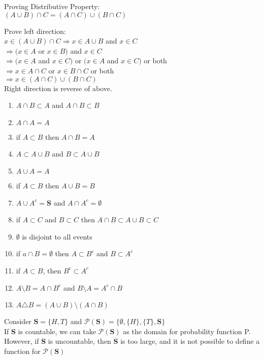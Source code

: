 \documentclass[12pt, oneside, letterpaper]{notes}
\begin{document}
\begin{remark}
	Proving Distributive Property: \\
	$(A \cup B) \cap C = (A \cap C) \cup (B \cap C)$ \\
	
	\begin{myproof}
		Prove left direction: \\
		$x \in (A \cup B) \cap C \Rightarrow x \in A \cup B$ and $x \in C$ \\
		$\Rightarrow (x \in A$ or $x \in B)$ and $x \in C$ \\
		$\Rightarrow (x \in A$ and $x \in C)$ 
		or $(x \in A$ and $x \in C)$ or both \\
		$\Rightarrow  x \in A \cap C$ or $x \in B \cap C$ or both \\
		$\Rightarrow  x \in (A\cap C) \cup (B \cap C)$ \\
		Right direction is reverse of above.
	\end{myproof}
\end{remark}

\begin{enumerate}
	\item $A \cap B \subset A$ and $A \cap B \subset B$
	\item $A \cap A = A$
	\item if $A \subset B $ then $A \cap B = A $
	\item $A \subset A \cup B$ and $B \subset A \cup B$
	\item $A \cup A = A$
	\item if $ A \subset B$ then $A \cup B = B$
	\item $A \cup A^c = \textbf{S}$ and $A \cap A^c = \emptyset$
	\item if $A \subset C$ and $B \subset C$ 
	then $A \cap B \subset A \cup B \subset C$
	\item $\emptyset$ is disjoint to all events
	\item if $a \cap B = \emptyset$ then $A \subset B^c$
	and $B \subset A^c$
	\item if $A \subset B$, then $B^c \subset A^c$
	\item $A \setminus B = A \cap B^c$ and $B \setminus A = A^c \cap B$
	\item $A \triangle B = (A \cup B) \setminus (A \cap B) $
\end{enumerate}

%
%

\begin{remark}
	Consider $\textbf{S} = \{H, T\}$ and $\mathscr{P}(\textbf{S}) = \{\emptyset, 
	\{H\}, \{T\}, \textbf{S} \}$ \\
	\indent If \textbf{S} is countable, we can take $\mathscr{P}(\textbf{S}) $
	as the domain for probability function P.  \\
	\indent However, if \textbf{S} is uncountable, then \textbf{S} is too large, 
	and it is not possible to define a function for $\mathscr{P}(\textbf{S}) $
\end{remark}
\end{document}

